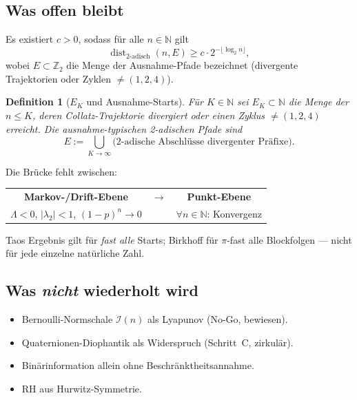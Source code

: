 \documentclass[12pt,a4paper]{article}
\newtheorem{definition}[satz]{Definition}
\newcommand{\N}{\mathbb{N}}
\newcommand{\Ztwo}{\mathbb{Z}_2}
\newcommand{\Lam}{\Lambda}
\newcommand{\disttwo}{\operatorname{dist}_{2\text{-adisch}}}
\begin{document}
\subsection{Was offen bleibt}

\begin{tcolorbox}[offen,title={Uniformitäts-Vermutung (offen)}]
Es existiert $c>0$, sodass für alle $n\in\N$ gilt
\[
  \disttwo(n,E) \geq c\cdot 2^{-\lfloor\log_2 n\rfloor},
\]
wobei $E\subset\Ztwo$ die Menge der Ausnahme-Pfade bezeichnet
(divergente Trajektorien oder Zyklen $\neq(1,2,4)$).
\end{tcolorbox}

\begin{definition}[$E_K$ und Ausnahme-Starts]
Für $K\in\N$ sei $E_K\subset\N$ die Menge der $n\leq K$, deren
Collatz-Trajektorie divergiert oder einen Zyklus $\neq(1,2,4)$ erreicht.
Die \emph{ausnahme-typischen} 2-adischen Pfade sind
\[
  E := \bigcup_{K\to\infty} \text{(2-adische Abschlüsse divergenter Präfixe)}.
\]
\end{definition}

\begin{tcolorbox}[kern]
Die Brücke fehlt zwischen:
\begin{center}
\begin{tabular}{ccc}
\textbf{Markov-/Drift-Ebene} & $\longrightarrow$ & \textbf{Punkt-Ebene} \\
$\Lam<0$, $|\lambda_2|<1$, $(1-p)^n\to 0$ & & $\forall n\in\N$: Konvergenz \\
\end{tabular}
\end{center}
Taos Ergebnis gilt für \emph{fast alle} Starts; Birkhoff für
$\pi$-fast alle Blockfolgen --- nicht für jede einzelne natürliche Zahl.
\end{tcolorbox}

\subsection{Was \emph{nicht} wiederholt wird}

\begin{itemize}[nosep]
  \item Bernoulli-Normschale $\mathcal{I}(n)$ als Lyapunov (No-Go, bewiesen).
  \item Quaternionen-Diophantik als Widerspruch (Schritt~C, zirkulär).
  \item Binärinformation allein ohne Beschränktheitsannahme.
  \item RH aus Hurwitz-Symmetrie.
\end{itemize}
\end{document}
